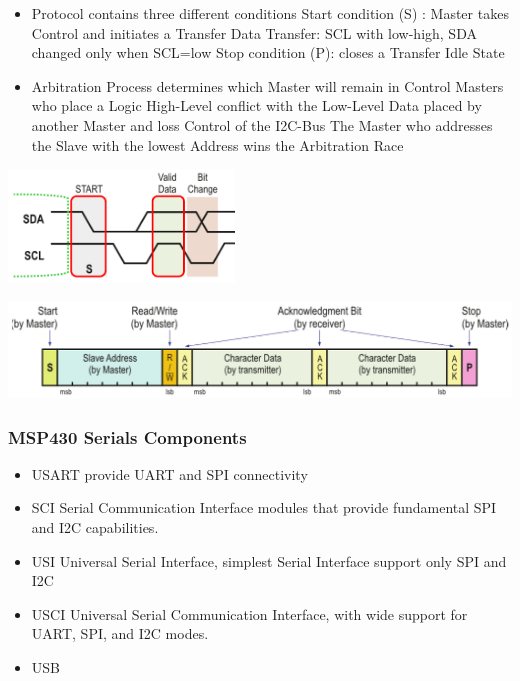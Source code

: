 \begin{minipage}{13cm}
	\begin{itemize}
		\item Protocol contains three different conditions
		\subitem Start condition (S) : Master takes Control and initiates a Transfer
		\subitem Data Transfer: SCL with low-high, SDA changed only when SCL=low
		\subitem Stop condition (P): closes a Transfer
		\subitem Idle State
		\item Arbitration Process determines which Master will remain in Control
		\subitem Masters who place a Logic High-Level conflict with the Low-Level Data placed by another Master and loss Control of the I2C-Bus
		\subitem The Master who addresses the Slave with the lowest Address wins the Arbitration Race
	\end{itemize}
\end{minipage}
\begin{minipage}{6cm}
	\includegraphics[width=6cm]{images/i2c_2.png}
\end{minipage}
\includegraphics[width=16cm]{images/i2c_data.png}\\
\clearpage
\pagebreak
\subsubsection{MSP430 Serials Components}
\begin{itemize}
	\item USART
	\subitem provide UART and SPI connectivity
	\item SCI
	\subitem Serial Communication Interface modules that provide fundamental SPI and I2C capabilities.
	\item USI
	\subitem Universal Serial Interface, simplest Serial Interface support only SPI and I2C
	\item USCI
	\subitem Universal Serial Communication Interface, with wide support for UART, SPI, and I2C modes.
	\item USB
\end{itemize}
\clearpage
\pagebreak
